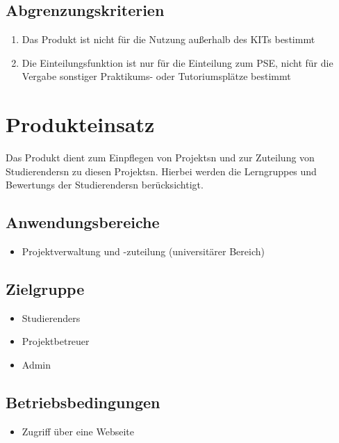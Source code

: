 \documentclass[parskip=full]{scrartcl}
\newcommand{\swtLabel}[1]{\textbf{/#1\arabic*0/}}
\begin{document}
\subsection{Abgrenzungskriterien}
\begin{enumerate}[label=\swtLabel{AG}]
 
  \item Das Produkt ist nicht für die Nutzung außerhalb des KITs bestimmt %

\item Die \gls{Einteilung}sfunktion ist nur für die \gls{Einteilung} zum \gls{PSE}, nicht
für die Vergabe sonstiger Praktikums- oder Tutoriumsplätze bestimmt
  
\end{enumerate}
\section{Produkteinsatz}
Das Produkt dient zum Einpflegen von \glspl{Projekt}n und zur Zuteilung von
\glspl{Studierender}n zu diesen \glspl{Projekt}n. Hierbei werden die \glspl{Lerngruppe}
und \glspl{Bewertung} der \glspl{Studierender}n berücksichtigt.


\subsection{Anwendungsbereiche}

\begin{itemize} 
  \item Projektverwaltung und -zuteilung (universitärer Bereich) %
\end{itemize}

\subsection{Zielgruppe}
\begin{itemize} 
  \item \glspl{Studierender}
  \item \gls{Projektbetreuer}
  \item \gls{Admin}
\end{itemize}

\subsection{Betriebsbedingungen}
\begin{itemize} 
  \item Zugriff über eine Webseite
\end{itemize}
\end{document}
